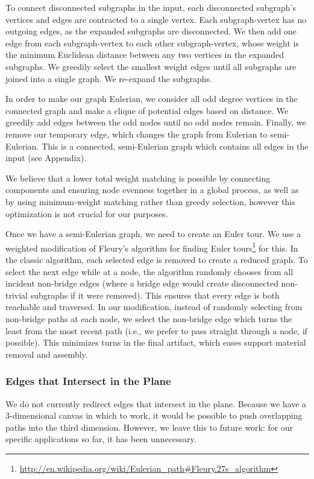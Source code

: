 To connect disconnected subgraphs in the input, each disconnected subgraph's vertices and edges are contracted to a single vertex.  Each subgraph-vertex has no outgoing edges, as the expanded subgraphs are disconnected.  We then add one edge from each subgraph-vertex to each other subgraph-vertex, whose weight is the minimum Euclidean distance between any two vertices in the expanded subgraphs.  We greedily select the smallest weight edges until all subgraphs are joined into a single graph.  We re-expand the subgraphs.

In order to make our graph Eulerian, we consider all odd degree vertices in the connected graph and make a clique of potential edges based on distance.  We greedily add edges between the odd nodes until no odd nodes remain.  Finally, we remove our temporary edge, which changes the graph from Eulerian to semi-Eulerian.  This is a connected, semi-Eulerian graph which contains all edges in the input (see Appendix).

We believe that a lower total weight matching is possible by connecting components and ensuring node evenness together in a global process, as well as by using minimum-weight matching rather than greedy selection, however this optimization is not crucial for our purposes.

Once we have a semi-Eulerian graph, we need to create an Euler tour.  We use a weighted modification of Fleury's algorithm for finding Euler tours\footnote{\url{http://en.wikipedia.org/wiki/Eulerian_path\#Fleury.27s_algorithm}} for this.  In the classic algorithm, each selected edge is removed to create a reduced graph.  To select the next edge while at a node, the algorithm randomly chooses from all incident non-bridge edges (where a bridge edge would create disconnected non-trivial subgraphs if it were removed).  This ensures that every edge is both reachable and traversed.  In our modification, instead of randomly selecting from non-bridge paths at each node, we select the non-bridge edge which turns the least from the most recent path (i.e., we prefer to pass straight through a node, if possible).  This minimizes turns in the final artifact, which eases support material removal and assembly.

\subsubsection{Edges that Intersect in the Plane}
We do not currently redirect edges that intersect in the plane.  Because we have a 3-dimensional canvas in which to work, it would be possible to push overlapping paths into the third dimension.  However, we leave this to future work: for our specific applications so far, it has been unnecessary.


